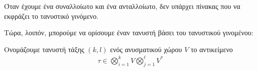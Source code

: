 \documentclass[main.tex]{subfiles}
\begin{document}
	Όταν έχουμε ένα συναλλοίωτο και ένα ανταλλοίωτο, δεν υπάρχει πίνακας που να εκφράζει το τανυστικό γινόμενο. 
	
	Τώρα, λοιπόν, μπορούμε να ορίσουμε έναν τανυστή βάσει του τανυστικού γινομένου:
	\begin{definition}
		Ονομάζουμε τανυστή τάξης $(k,l)$ ενός ανυσματικού χώρου $V$ το αντικείμενο
		\begin{align*}
			\tau \in \bigotimes_{i=1}^{k}V\bigotimes_{j=1}^{\ell}V^*
		\end{align*}
	\end{definition}
\end{document}
